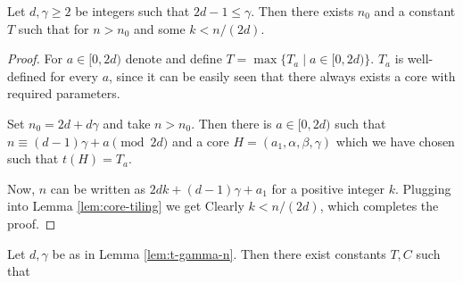 \begin{lem}
\label{lem:t-gamma-n}

Let $d,\gamma \geq 2$ be integers such that $2d-1 \leq \gamma$. Then there exists $n_0$ and a constant $T$ such that
%
for $n > n_0$ and some $k < n/(2d)$.
\end{lem}
\begin{proof}
For $a \in [0,2d)$ denote
%
and define $T = \max \{T_a \mid a \in [0,2d)\}$. $T_a$ is well-defined for every $a$, since it can be easily seen that there always exists a core with required parameters.

Set $n_0 = 2d+d\gamma$ and take $n > n_0$. Then there is $a \in [0,2d)$ such that $n \equiv (d-1)\gamma + a \pmod{2d}$ and a core $H=(a_1,\alpha,\beta,\gamma)$ which we have chosen such that $t(H) = T_a$.

Now, $n$ can be written as $2dk + (d-1)\gamma + a_1$ for a positive integer $k$. Plugging into Lemma \ref{lem:core-tiling} we get
%
Clearly $k < n/(2d)$, which completes the proof.
\end{proof}

\begin{cor}
\label{cor:log-t-gamma-n}
Let $d,\gamma$ be as in Lemma \ref{lem:t-gamma-n}. Then there exist constants $T,C$ such that
%
\end{cor}%

